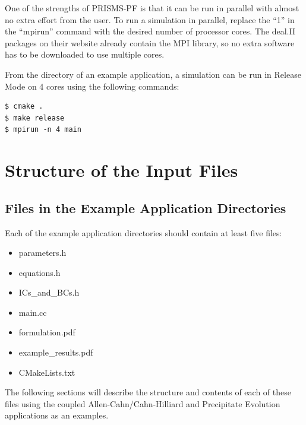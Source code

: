 \documentclass[10pt]{article} %
\begin{document}
One of the strengths of PRISMS-PF is that it can be run in parallel with almost no extra effort from the user. To run a simulation in parallel, replace the ``1'' in the ``mpirun'' command with the desired number of processor cores. The deal.II packages on their website already contain the MPI library, so no extra software has to be downloaded to use multiple cores.

From the directory of an example application, a simulation can be run in Release Mode on 4 cores using the following commands:
\begin{lstlisting}
$ cmake . 
$ make release
$ mpirun -n 4 main 
\end{lstlisting}

\section{Structure of the Input Files}
\subsection{Files in the Example Application Directories}
Each of the example application directories should contain at least five files:
\begin{itemize}
\item parameters.h
\item equations.h
\item ICs\_and\_BCs.h
\item main.cc
\item formulation.pdf
\item example\_results.pdf
\item CMakeLists.txt
\end{itemize}

The following sections will describe the structure and contents of each of these files using the coupled Allen-Cahn/Cahn-Hilliard and Precipitate Evolution applications as an examples.
\end{document}
